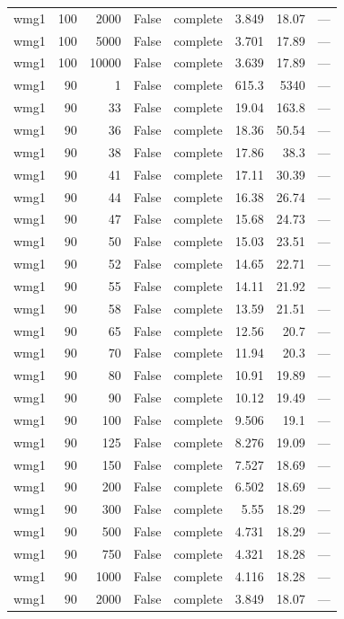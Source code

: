 \begin{tabular}{lrrrlrrl}
wmg1 & 100 & 2000 & False & complete & 3.849 & 18.07 & — \\
wmg1 & 100 & 5000 & False & complete & 3.701 & 17.89 & — \\
wmg1 & 100 & 10000 & False & complete & 3.639 & 17.89 & — \\
wmg1 & 90 & 1 & False & complete & 615.3 & 5340 & — \\
wmg1 & 90 & 33 & False & complete & 19.04 & 163.8 & — \\
wmg1 & 90 & 36 & False & complete & 18.36 & 50.54 & — \\
wmg1 & 90 & 38 & False & complete & 17.86 & 38.3 & — \\
wmg1 & 90 & 41 & False & complete & 17.11 & 30.39 & — \\
wmg1 & 90 & 44 & False & complete & 16.38 & 26.74 & — \\
wmg1 & 90 & 47 & False & complete & 15.68 & 24.73 & — \\
wmg1 & 90 & 50 & False & complete & 15.03 & 23.51 & — \\
wmg1 & 90 & 52 & False & complete & 14.65 & 22.71 & — \\
wmg1 & 90 & 55 & False & complete & 14.11 & 21.92 & — \\
wmg1 & 90 & 58 & False & complete & 13.59 & 21.51 & — \\
wmg1 & 90 & 65 & False & complete & 12.56 & 20.7 & — \\
wmg1 & 90 & 70 & False & complete & 11.94 & 20.3 & — \\
wmg1 & 90 & 80 & False & complete & 10.91 & 19.89 & — \\
wmg1 & 90 & 90 & False & complete & 10.12 & 19.49 & — \\
wmg1 & 90 & 100 & False & complete & 9.506 & 19.1 & — \\
wmg1 & 90 & 125 & False & complete & 8.276 & 19.09 & — \\
wmg1 & 90 & 150 & False & complete & 7.527 & 18.69 & — \\
wmg1 & 90 & 200 & False & complete & 6.502 & 18.69 & — \\
wmg1 & 90 & 300 & False & complete & 5.55 & 18.29 & — \\
wmg1 & 90 & 500 & False & complete & 4.731 & 18.29 & — \\
wmg1 & 90 & 750 & False & complete & 4.321 & 18.28 & — \\
wmg1 & 90 & 1000 & False & complete & 4.116 & 18.28 & — \\
wmg1 & 90 & 2000 & False & complete & 3.849 & 18.07 & — \\

\end{tabular}
